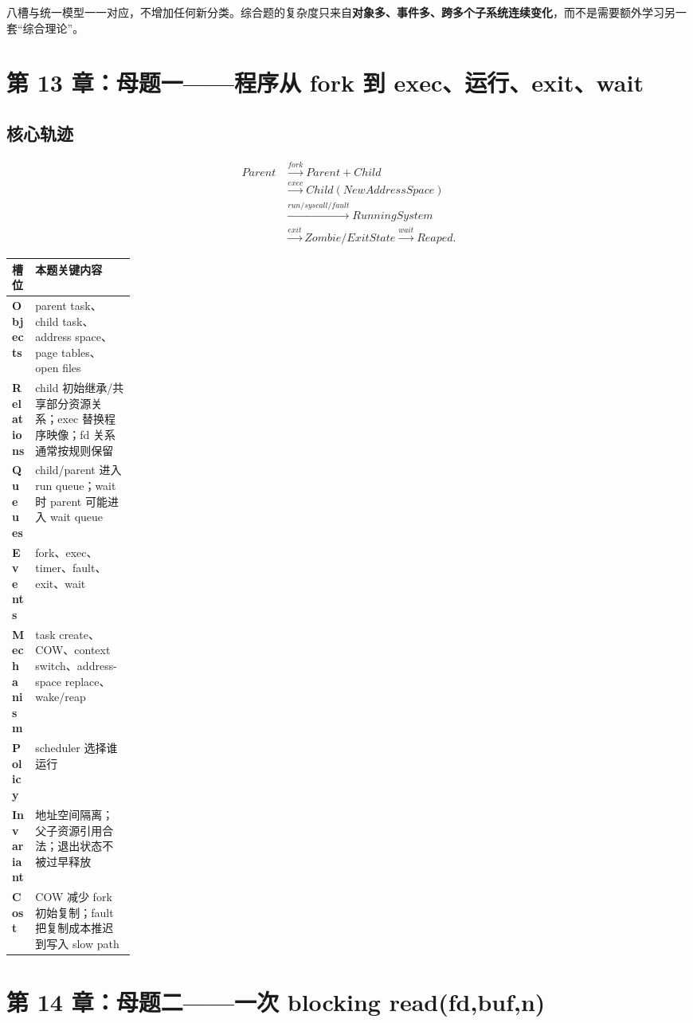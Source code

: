 \documentclass[11pt,a4paper]{ctexart}
\newcommand{\kw}[1]{\textbf{#1}}
\begin{document}
\begin{method}[为什么只用八槽]
八槽与统一模型一一对应，不增加任何新分类。综合题的复杂度只来自\kw{对象多、事件多、跨多个子系统连续变化}，而不是需要额外学习另一套“综合理论”。
\end{method}

\section{第 13 章：母题一——程序从 fork 到 exec、运行、exit、wait}

\subsection{核心轨迹}
\[
\begin{aligned}
Parent&\xrightarrow{fork}Parent+Child\\
&\xrightarrow{exec}Child(NewAddressSpace)\\
&\xrightarrow{run/syscall/fault}RunningSystem\\
&\xrightarrow{exit}Zombie/ExitState\xrightarrow{wait}Reaped.
\end{aligned}
\]

\begin{center}
\small
\begin{tabularx}{\linewidth}{>{\bfseries}p{0.18\linewidth} X}
\toprule
槽位 & 本题关键内容 \\
\midrule
Objects & parent task、child task、address space、page tables、open files \\
Relations & child 初始继承/共享部分资源关系；exec 替换程序映像；fd 关系通常按规则保留 \\
Queues & child/parent 进入 run queue；wait 时 parent 可能进入 wait queue \\
Events & fork、exec、timer、fault、exit、wait \\
Mechanism & task create、COW、context switch、address-space replace、wake/reap \\
Policy & scheduler 选择谁运行 \\
Invariant & 地址空间隔离；父子资源引用合法；退出状态不被过早释放 \\
Cost & COW 减少 fork 初始复制；fault 把复制成本推迟到写入 slow path \\
\bottomrule
\end{tabularx}
\end{center}

\section{第 14 章：母题二——一次 blocking read(fd,buf,n)}
\end{document}
